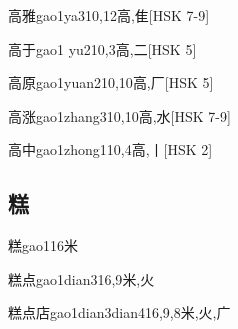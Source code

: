 \begin{EntryWithPhonetic}{高雅}{gao1ya3}{10,12}{⾼,⾫}[HSK 7-9]
\end{EntryWithPhonetic}

\begin{EntryWithPhonetic}{高于}{gao1 yu2}{10,3}{⾼,⼆}[HSK 5]
\end{EntryWithPhonetic}

\begin{EntryWithPhonetic}{高原}{gao1yuan2}{10,10}{⾼,⼚}[HSK 5]
\end{EntryWithPhonetic}

\begin{EntryWithPhonetic}{高涨}{gao1zhang3}{10,10}{⾼,⽔}[HSK 7-9]
\end{EntryWithPhonetic}

\begin{EntryWithPhonetic}{高中}{gao1zhong1}{10,4}{⾼,⼁}[HSK 2]
\end{EntryWithPhonetic}

\subsection*{糕}

\begin{EntryWithPhonetic}{糕}{gao1}{16}{⽶}
\end{EntryWithPhonetic}

\begin{EntryWithPhonetic}{糕点}{gao1dian3}{16,9}{⽶,⽕}
\end{EntryWithPhonetic}

\begin{EntryWithPhonetic}{糕点店}{gao1dian3dian4}{16,9,8}{⽶,⽕,⼴}
\end{EntryWithPhonetic}

